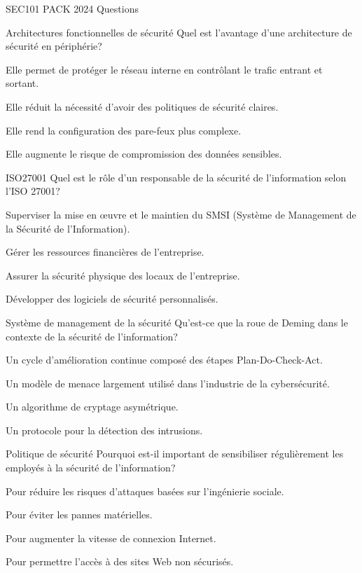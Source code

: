 \documentclass[12pt]{article}
\begin{document}
\begin{quiz}{SEC101 PACK 2024 Questions}
\begin{multi}[points=1]{Architectures fonctionnelles de sécurité}
Quel est l'avantage d'une architecture de sécurité en périphérie?
\item* Elle permet de protéger le réseau interne en contrôlant le trafic entrant et sortant.
\item Elle réduit la nécessité d'avoir des politiques de sécurité claires.
\item Elle rend la configuration des pare-feux plus complexe.
\item Elle augmente le risque de compromission des données sensibles.
\end{multi}

\begin{multi}[points=1]{ISO27001}
Quel est le rôle d'un responsable de la sécurité de l'information selon l'ISO 27001?
\item* Superviser la mise en œuvre et le maintien du SMSI (Système de Management de la Sécurité de l'Information).
\item Gérer les ressources financières de l'entreprise.
\item Assurer la sécurité physique des locaux de l'entreprise.
\item Développer des logiciels de sécurité personnalisés.
\end{multi}

\begin{multi}[points=1]{Système de management de la sécurité}
Qu'est-ce que la roue de Deming dans le contexte de la sécurité de l'information?
\item* Un cycle d'amélioration continue composé des étapes Plan-Do-Check-Act.
\item Un modèle de menace largement utilisé dans l'industrie de la cybersécurité.
\item Un algorithme de cryptage asymétrique.
\item Un protocole pour la détection des intrusions.
\end{multi}

\begin{multi}[points=1]{Politique de sécurité}
Pourquoi est-il important de sensibiliser régulièrement les employés à la sécurité de l'information?
\item* Pour réduire les risques d'attaques basées sur l'ingénierie sociale.
\item Pour éviter les pannes matérielles.
\item Pour augmenter la vitesse de connexion Internet.
\item Pour permettre l'accès à des sites Web non sécurisés.
\end{multi}


\end{quiz}
\end{document}
